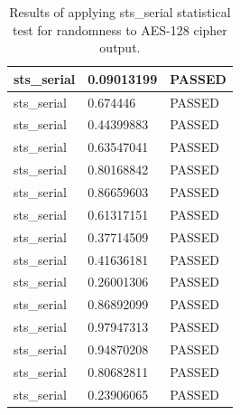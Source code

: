 \documentclass[conference]{IEEEtran}
\begin{document}
\begin{center}
\begin{table}[H]
\begin{tabular}{|l|l|l|}
sts\_serial                            & 0.09013199 & PASSED \\ \hline
sts\_serial                            & 0.674446   & PASSED \\ \hline
sts\_serial                            & 0.44399883 & PASSED \\ \hline
sts\_serial                            & 0.63547041 & PASSED \\ \hline
sts\_serial                            & 0.80168842 & PASSED \\ \hline
sts\_serial                            & 0.86659603 & PASSED \\ \hline
sts\_serial                            & 0.61317151 & PASSED \\ \hline
sts\_serial                            & 0.37714509 & PASSED \\ \hline
sts\_serial                            & 0.41636181 & PASSED \\ \hline
sts\_serial                            & 0.26001306 & PASSED \\ \hline
sts\_serial                            & 0.86892099 & PASSED \\ \hline
sts\_serial                            & 0.97947313 & PASSED \\ \hline
sts\_serial                            & 0.94870208 & PASSED \\ \hline
sts\_serial                            & 0.80682811 & PASSED \\ \hline
sts\_serial                            & 0.23906065 & PASSED \\ \hline
\end{tabular}
\caption{Results of applying sts\_serial statistical test for randomness to AES-128 cipher output.}
\label{dieharderesults1}
\end{table}
\end{center}
\end{document}
